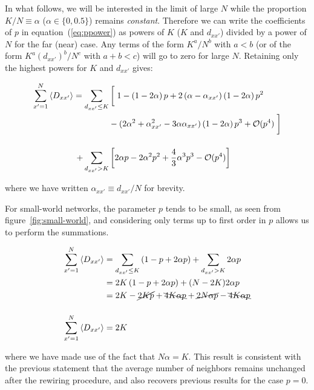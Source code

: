 In what follows, we will be interested in the limit of large $N$ while the proportion $K/N\equiv \alpha$ ($\alpha \in \{0, 0.5\}$)
remains \textit{constant}. Therefore we can write the coefficients of $p$ in equation~(\ref{eq:ppower}) as powers of $K$ ($K$ and
$d_{xx'}$) divided by a power of $N$ for the far (near) case. Any terms of the form $K^a/N^b$ with $a<b$ (or of the form
$K^a(d_{xx'})^b/N^c$ with $a+b<c$) will go to zero for large $N$. Retaining only the highest powers for $K$ and $d_{xx'}$ gives:

\begin{align}
    \label{eq:ppower2}
    \begin{split}
    \sum_{x'=1}^N \left< D_{xx'} \right> = \sum_{d_{xx'}\leq K} &\left[ \vphantom{\frac{2K}{N}} \right. 1 - \left( 1 - 2\alpha \right) p + 2\left( \alpha-\alpha_{xx'} \right) \left( 1 - 2\alpha \right) p^2 \\
    &- (2\alpha^2 + \alpha_{xx'}^2 - 3\alpha\alpha_{xx'})\left( 1 - 2\alpha \right)p^3 + \mathcal{O}(p^4) \left. \vphantom{\frac{2K}{N}} \right] \\[12pt]
    +\sum_{d_{xx'}> K} &\left[ 2\alpha p - 2\alpha^2 p^2 + \frac{4}{3}\alpha^3 p^3 - \mathcal{O}(p^4) \right]
    \end{split}
\end{align}

\noindent where we have written $\alpha_{xx'} \equiv d_{xx'}/N$ for brevity.

For small-world networks, the parameter $p$ tends to be small\cite{rodrigues2020synchronization}, as seen from
figure~\ref{fig:small-world}, and considering only terms up to first order in $p$ allows us to perform the summations.

\begin{align}
    \sum_{x'=1}^N \left< D_{xx'} \right> &= \sum_{d_{xx'}\leq K} \left( 1 - p + 2\alpha p \right) + \sum_{d_{xx'}> K} 2\alpha p \notag\\
    &= 2K\left( 1 - p + 2\alpha p \right) + (N-2K)2\alpha p \notag\\
    &= 2K - \cancel{2Kp} + \bcancel{4K\alpha p} + \cancel{2N\alpha p} - \bcancel{4K\alpha p} \notag\\[12pt]
    \sum_{x'=1}^N \left< D_{xx'} \right> &= 2K
    \label{eq:ppower3}
\end{align}

\noindent where we have made use of the fact that $N\alpha = K$. This result is consistent with the previous statement that the average
number of neighbors remains unchanged after the rewiring procedure, and also recovers previous results\cite{escaff2014arrays} for the
case $p=0$.

